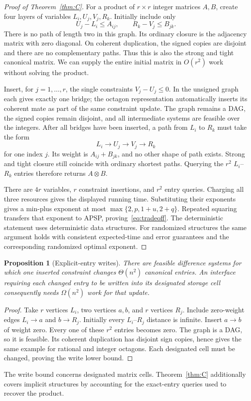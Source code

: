 \documentclass[manuscript,11pt,screen,nonacm]{acmart}
\newtheorem{proposition}[theorem]{Proposition}
\theoremstyle{definition}
\begin{document}
\begin{proof}[Proof of Theorem~\ref{thm:C}]
For a product of $r\times r$ integer matrices $A,B$, create four layers of variables $L_i,U_j,V_j,R_k$. Initially include only
\[
 U_j-L_i\leq A_{ij},\qquad R_k-V_j\leq B_{jk}.
\]
There is no path of length two in this graph. Its ordinary closure is the adjacency matrix with zero diagonal. On coherent duplication, the signed copies are disjoint and there are no complementary paths. Thus this is also the strong and tight canonical matrix. We can supply the entire initial matrix in $O(r^2)$ work without solving the product.

Insert, for $j=1,\ldots,r$, the single constraints $V_j-U_j\leq0$. In the unsigned graph each gives exactly one bridge; the octagon representation automatically inserts its coherent mate as part of the same constraint update. The graph remains a DAG, the signed copies remain disjoint, and all intermediate systems are feasible over the integers. After all bridges have been inserted, a path from $L_i$ to $R_k$ must take the form
\[
 L_i\longrightarrow U_j\longrightarrow V_j\longrightarrow R_k
\]
for one index $j$. Its weight is $A_{ij}+B_{jk}$, and no other shape of path exists. Strong and tight closure still coincide with ordinary shortest paths. Querying the $r^2$ $L_i$--$R_k$ entries therefore returns $A\otimes B$.

There are $4r$ variables, $r$ constraint insertions, and $r^2$ entry queries. Charging all three resources gives the displayed running time. Substituting their exponents gives a min-plus exponent at most $\max\{2,p,1+u,2+q\}$. Repeated squaring transfers that exponent to APSP, proving~\eqref{eq:tradeoff}. The deterministic statement uses deterministic data structures. For randomized structures the same argument holds with consistent expected-time and error guarantees and the corresponding randomized optimal exponent.
\end{proof}

\begin{proposition}[Explicit-entry writes]\label{prop:writes}
There are feasible difference systems for which one inserted constraint changes $\Theta(n^2)$ canonical entries. An interface requiring each changed entry to be written into its designated storage cell consequently needs $\Omega(n^2)$ work for that update.
\end{proposition}
\begin{proof}
Take $r$ vertices $L_i$, two vertices $a,b$, and $r$ vertices $R_j$. Include zero-weight edges $L_i\to a$ and $b\to R_j$. Initially every $L_i$--$R_j$ distance is infinite. Insert $a\to b$ of weight zero. Every one of these $r^2$ entries becomes zero. The graph is a DAG, so it is feasible. Its coherent duplication has disjoint sign copies, hence gives the same example for rational and integer octagons. Each designated cell must be changed, proving the write lower bound.
\end{proof}
The write bound concerns designated matrix cells. Theorem~\ref{thm:C} additionally covers implicit structures by accounting for the exact-entry queries used to recover the product.
\end{document}

